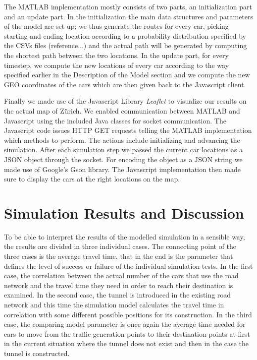 \documentclass[11pt]{article}
\begin{document}
The MATLAB implementation mostly consists of two parts, an initialization part and an update part. In the initialization the main data structures and parameters of the model are set up; we thus generate the routes for every car, picking starting and ending location according to a probability distribution specified by the CSVs files (reference...) and the actual path will be generated by computing the shortest path between the two locations. In the update part, for every timestep, we compute the new locations of every car according to the way specified earlier in the Description of the Model section and we compute the new GEO coordinates of the cars which are then given back to the Javascript client.

Finally we made use of the Javascript Library \emph{Leaflet}\cite{leaflet} to visualize our results on the actual map of Z\"urich.
We enabled communication between MATLAB and Javascript using the included Java classes for socket communication.
The Javascript code issues HTTP GET requests telling the MATLAB implementation which methods to perform.
The actions include initializing and advancing the simulation.
After each simulation step we passed the current car locations as a JSON object through the socket.
For encoding the object as a JSON string we made use of Google's Gson library\cite{gson}.
The Javascript implementation then made sure to display the cars at the right locations on the map.
\section{Simulation Results and Discussion}
To be able to interpret the results of the modelled simulation in a sensible way, the results are divided in three individual cases. The connecting point of the three cases is the average travel time, that in the end is the parameter that defines the level of success or failure of the individual simulation tests. In the first case, the correlation between the actual number of the cars that use the road network and the travel time they need in order to reach their destination is examined. In the second case, the tunnel is introduced in the existing road network and this time the simulation model calculates the travel time in correlation with some different possible positions for its construction. In the third case, the comparing model parameter is once again the average time needed for cars to move from the traffic generation points to their destination points at first in the current situation where the tunnel does not exist and then in the case the tunnel is constructed.
\end{document}
